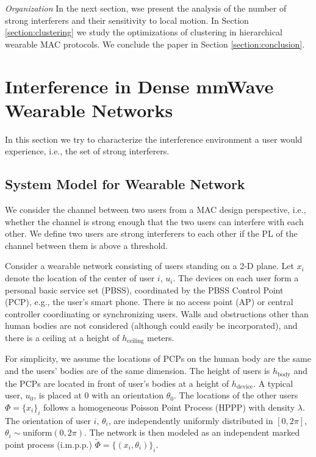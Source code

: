 \documentclass[10pt, conference, letterpaper]{IEEEtran}
\begin{document}
\emph{Organization}
In the next section, wse present the analysis of the number of strong interferers and their sensitivity to local motion. 
In Section \ref{section:clustering} we study the optimizations of clustering in hierarchical wearable MAC protocols.
We conclude the paper in Section \ref{section:conclusion}.

\section{Interference in Dense mmWave Wearable Networks}\label{section:interference}
In this section we try to characterize the interference environment a user would experience, i.e., the set of strong interferers.

\subsection{System Model for Wearable Network}\label{section:channel:model}
We consider the channel between two users from a MAC design perspective, i.e., whether the channel is strong enough that the two users can interfere with each other. 
We define two users are strong interferers to each other if the PL of the channel between them is above a threshold.

Consider a wearable network consisting of users standing on a 2-D plane.
Let $x_i$ denote the location of the center of user $i$, $u_i$. 
The devices on each user form a personal basic service set (PBSS), coordinated by the PBSS Control Point (PCP), e.g., the user's smart phone.
There is no access point (AP) or central controller coordinating or synchronizing users.
Walls and obstructions other than human bodies are not considered (although could easily be incorporated), and there is a ceiling at a height of $h_{\mathrm{ceiling}}$ meters. 


For simplicity, we assume the locations of PCPs on the human body are the same and the users' bodies are of the same dimension. 
The height of users is $h_{\mathrm{body}}$ and the PCPs are located in front of user's bodies at a height of $h_{\mathrm{device}}$.
A typical user, $u_0$, is placed at $0$ with an orientation $\theta_0$. 
The locations of the other users $\Phi=\{x_i\}_i$ follows a homogeneous Poisson Point Process (HPPP) with density $\lambda$.
The orientation of user $i$, $\theta_i$, are independently uniformly distributed in $[0, 2\pi]$, $\theta_i\sim \mathrm{uniform}(0,2\pi)$.
The network is then modeled as an independent marked point process (i.m.p.p.) $\tilde{\Phi}=\{(x_i, \theta_i)\}_i$.
\end{document}
